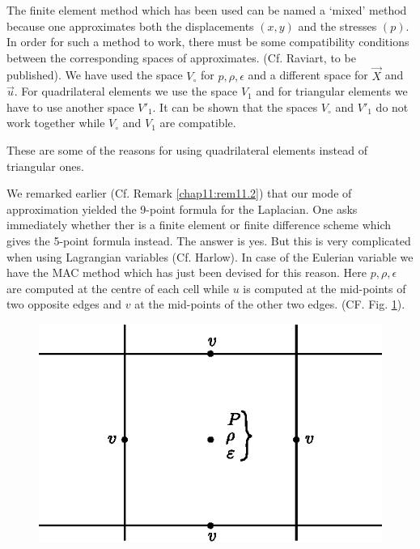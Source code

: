 \begin{remark}
The finite element method which has been used can be named a `mixed' method because one approximates both the displacements $(x,y)$ and the stresses $(p)$. In order for such a method to work, there must be some compatibility conditions between the corresponding spaces of approximates. (Cf. Raviart, to be published). We have used the space $V_\circ$ for $p,\rho, \epsilon$ and a different space for $\vec{X}$ and $\vec{u}$. For quadrilateral elements we use the space $V_1$ and for triangular elements we have to use another space $V'_1$. It can be shown that the spaces $V_\circ$ and $V'_1$ do not work together while $V_\circ$ and $V_1$ are compatible.

These are some of the reasons for using quadrilateral elements instead of triangular ones.
\end{remark}

\begin{remark}\label{chap11:rem11.6}
  We remarked earlier (Cf. Remark \ref{chap11:rem11.2}) that our mode
  of approximation yielded the 9-point formula for the Laplacian. One
  asks immediately whether ther is a finite element or finite
  difference scheme which gives the {5-point formula} instead. The
  answer is yes. But this is very complicated when using Lagrangian
  variables (Cf. Harlow). In case of the Eulerian variable we have the
  MAC method which has just been devised for this reason. Here
  $p,\rho, \epsilon$ are computed at the centre of each cell while $u$
  is computed at the mid-points of two opposite edges and $v$ at the
  mid-points of the other two edges. (CF. Fig. \ref{c11:fig11.5}). 

\begin{figure}[H]
\centering
\includegraphics{figures/fig52-11.5.eps}
\caption{}\label{c11:fig11.5}
\end{figure}\pageoriginale 
\end{remark}

